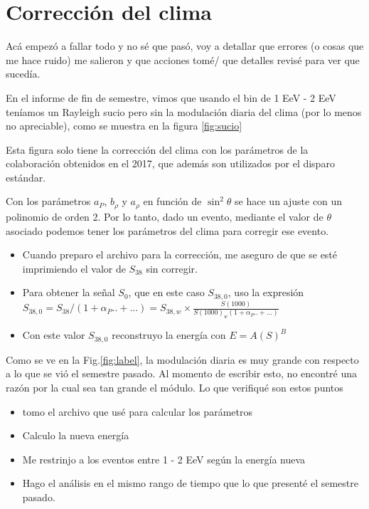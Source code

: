 \section{Corrección del clima}

Acá empezó a fallar todo y no sé que pasó, voy a detallar que errores (o cosas que me hace ruido) me salieron y que acciones tomé/ que detalles revisé para ver que sucedía.

En el informe de fin  de semestre, vimos que usando el bin  de 1 EeV - 2 EeV teníamos un Rayleigh sucio pero sin  la modulación diaria del clima (por lo menos no apreciable), como se muestra en la figura \ref{fig:sucio}



Esta figura solo tiene la corrección del clima con los parámetros de la colaboración obtenidos en el 2017, que además son utilizados por el disparo estándar.

Con los parámetros $a_P$, $b_\rho$ y $a_\rho$ en función de $\sin^2 \theta$ se hace un ajuste con un polinomio de orden 2. Por lo tanto, dado un evento, mediante el  valor de $\theta$ asociado podemos tener los parámetros del clima para corregir ese evento.



\begin{itemize}
\item Cuando preparo el archivo para la corrección, me aseguro de que se esté imprimiendo el valor de $S_{38}$ sin corregir.

\item Para obtener la señal $S_0$, que en este caso $S_{38,0}$, uso la expresión $S_{38,0} = S_{38}/(1 + \alpha_P..+ ...) = S_{38,w}\times \frac{S(1000)}{S(1000)_w (1 + \alpha_P..+ ...)  }$  

\item Con este valor $S_{38,0}$ reconstruyo la energía con $E=A (S)^B$

\end{itemize}



Como se ve en la Fig.\ref{fig:label}, la modulación diaria es muy grande con respecto a  lo que se vió el semestre pasado. Al momento de escribir esto, no encontré una razón por la cual sea tan grande el módulo. Lo que verifiqué son estos puntos

\begin{itemize}
	\item tomo el archivo que usé para calcular los parámetros
	\item Calculo la nueva energía
	\item Me restrinjo a los eventos entre 1 - 2 EeV según la energía nueva
	\item Hago el análisis en el mismo rango de tiempo que lo que presenté el semestre pasado.
\end{itemize}

